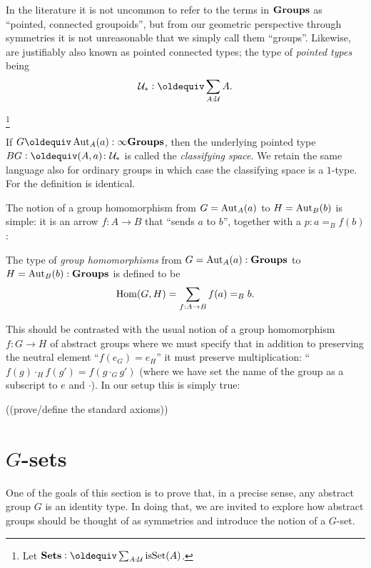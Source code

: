 \begin{remark}
  In the literature it is not uncommon to refer to the terms in $\mathbf{Groups}$ as ``pointed, connected groupoids'', but from our geometric perspective through symmetries it is not unreasonable that we simply call them ``groups''.  Likewise, \inftygps are justifiably also known as pointed connected types;  the type of {\em pointed types} being
$$\pttype\defequi\sum_{A:\mathcal U}A.$$
\end{remark}

  
\footnote{Let $\typeset\defequi \sum_{A:\mathcal U}\isset(A)$.}
\begin{definition}
  If $G\oldequiv\Aut_A(a):\typeinftygp$, then the underlying pointed type $BG\defequi (A,a)\colon\pttype$ is called the  {\em classifying space}.  We retain the same language also for ordinary groups in which case the classifying space is a $1$-type.   For \inftygps the definition is identical.
\end{definition}

  
The notion of a group homomorphism from $G=\mathrm{Aut}_A(a)$ to $H=\mathrm{Aut}_B(b)$ is simple: it is an arrow $f:A\to B$ that ``sends $a$ to $b$'', \ie together with a $p:a=_Bf(b)$:
\begin{definition}\label{def:grouphomomorphism}
  The type of {\em group homomorphisms} from $G=\mathrm{Aut}_A(a):\mathbf{Groups}$ to $H=\mathrm{Aut}_B(b):\mathbf{Groups}$ is defined to be
$$\mathrm{Hom}(G,H)=\sum_{f:A\to B}f(a)=_Bb.
$$
\end{definition}
This should be contrasted with the usual notion of a group homomorphism $f\colon G\to H$ of abstract groups where we must specify that in addition to preserving the neutral element ``$f(e_G)=e_H$'' it must preserve multiplication: ``$f(g)\cdot_H f(g')=f(g\cdot_G g')$ (where we have set the name of the group as a subscript to $e$ and $\cdot$).  In our setup this is simply true:

\begin{definition}\label{def:grouphomomaxioms}
  ((prove/define the standard axioms))
\end{definition}




\section{$G$-sets}
\label{sec:gsets}
One of the goals of this section is to prove that, in a precise sense, any abstract group $G$ is an identity type.  In doing that, we are invited to explore how abstract groups should be thought of as symmetries and introduce the notion of a $G$-set.

